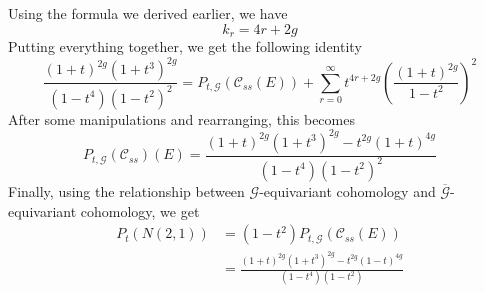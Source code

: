 Using the formula we derived earlier, we have
\[
k_r = 4r + 2g
\]
Putting everything together, we get the following identity
\[
\frac{(1+t)^{2g}(1+t^3)^{2g}}{(1-t^4)(1-t^2)^2} = P_{t,\mathscr{G}}(\mathscr{C}_{ss}(E))
+ \sum_{r=0}^\infty t^{4r+2g}\left(\frac{(1+t)^{2g}}{1-t^2}\right)^2
\]
After some manipulations and rearranging, this becomes
\[
P_{t, \mathscr{G}}(\mathscr{C}_{ss})(E)
= \frac{(1+t)^{2g}(1+t^3)^{2g}-t^{2g}(1+t)^{4g}}{(1-t^4)(1-t^2)^2}
\]
Finally, using the relationship between $\mathscr{G}$-equivariant cohomology
and $\overline{\mathscr{G}}$-equivariant cohomology, we get
\begin{align*}
P_t(N(2,1)) &= (1-t^2)P_{t,\mathscr{G}}(\mathscr{C}_{ss}(E)) \\
&= \frac{(1+t)^{2g}(1+t^3)^{2g} - t^{2g}(1-t)^{4g}}{(1-t^4)(1-t^2)}
\end{align*}
%